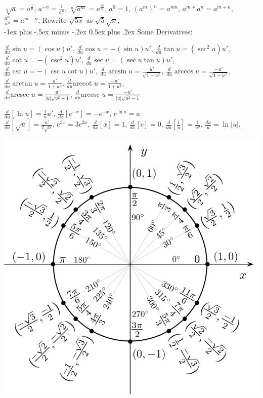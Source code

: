 \documentclass[10pt,landscape]{article}
\makeatletter
\renewcommand{\section}{\@startsection{section}{1}{0mm}%
                                {-1ex plus -.5ex minus -.2ex}%
                                {0.5ex plus .2ex}%
                                {\normalfont\large\bfseries}}
\makeatother
\begin{document}
\begin{multicols}{3}
$\sqrt[n]{a} = a^\frac{1}{n}$, $a^{-n} = \frac{1}{a^n}$, $\sqrt[n]{a^m} = a^\frac{m}{n}$, $a^0 = 1$, $\left( a^m \right)^n = a^{mn}$, 
$a^m * a^n = a^{m + n}$, $\frac{ a^m }{ a^n } = a^{m-n}$, Rewrite $\sqrt{5x}$ as $\sqrt{5} \sqrt{x}$, \\





\section{Some Derivatives:}

$\frac{d}{du} \sin u = (\cos u)u'$, $\frac{d}{du} \cos u = -(\sin u)u'$, $\frac{d}{du} \tan u = (\sec^2 u)u'$,
$\frac{d}{du} \cot u = -(\csc^2 u)u'$, $\frac{d}{du} \sec u = (\sec u \tan u)u'$, $\frac{d}{du} \csc u = -(\csc u \cot u)u'$,
$\frac{d}{du} \arcsin u = \frac{u'}{\sqrt{1 - u^2}}$, $\frac{d}{du} \arccos u = \frac{-u'}{\sqrt{1 - u^2}}$,
$\frac{d}{du} \arctan u = \frac{u'}{1 + u^2}$, $\frac{d}{du} $arccot $ u = \frac{-u'}{1 + u^2}$, \\
$\frac{d}{du} $arcsec $ u = \frac{u'}{|u|\sqrt{u^2 - 1}}$,
$\frac{d}{du} $arccsc $ u = \frac{-u'}{|u|\sqrt{u^2 - 1}}$

$\frac{d}{du}[\ln{u}] = \frac{1}{u}u'$, $\frac{d}{dx}[e^{-x}] = -e^{-x}$, $e^{\ln a} = a$ \\
$\frac{d}{du}[\sqrt{u}] = \frac{u'}{2 \sqrt{u}}$, $e^{3x} = 3e^{3x}$, $\frac{d}{dx}\left[ x \right] = 1$, $\frac{d}{dx}\left[ c \right] = 0$, 
$\frac{d}{du}[ \frac{1}{u} ] = \frac{1}{u^2}$, $\frac{du}{u} = \ln |u|$,


\includegraphics[width = \linewidth]{./img/unitCircle}






\end{multicols}
\end{document}
